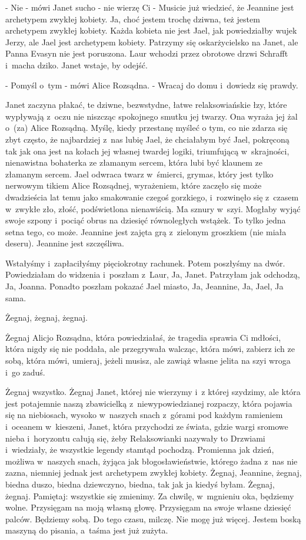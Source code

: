 \documentclass[oneside,polish,12pt,sfheadings]{mwbk}
\begin{document}
- Nie - mówi Janet sucho - nie wierzę Ci - Musicie już wiedzieć, że
Jeannine jest archetypem zwykłej kobiety. Ja, choć jestem trochę dziwna,
też jestem archetypem zwykłej kobiety. Każda kobieta nie jest Jael,
jak powiedziałby wujek Jerzy, ale Jael jest archetypem kobiety. Patrzymy
się oskarżycielsko na Janet, ale Panna Evasyn nie jest poruszona.
Laur wchodzi przez obrotowe drzwi Schrafft i~macha dziko. Janet wstaje,
by odejść.

- Pomyśl o~tym - mówi Alice Rozsądna. - Wracaj do domu i~dowiedz się
prawdy.

Janet zaczyna płakać, te dziwne, bezwstydne, łatwe relaksowiańskie
łzy, które wypływają z~oczu nie niszcząc spokojnego smutku jej twarzy.
Ona wyraża jej żal o~(za) Alice Rozsądną. Myślę, kiedy przestanę myśleć
o tym, co nie zdarza się zbyt często, że najbardziej z~nas lubię Jael,
że chciałabym być Jael, pokręconą tak jak ona jest na kołach jej własnej
twardej logiki, triumfującą w~skrajności, nienawistna bohaterka ze
złamanym sercem, która lubi być klaunem ze złamanym sercem. Jael odwraca
twarz w~śmierci, grymas, który jest tylko nerwowym tikiem Alice Rozsądnej,
wyrażeniem, które zaczęło się może dwadzieścia lat temu jako smakowanie
czegoś gorzkiego, i~rozwinęło się z~czasem w~zwykłe zło, złość, podświetlona
nienawiścią. Ma sznury w~szyi. Mogłaby wyjąć swoje szpony i~pociąć
obrus na dziesięć równoległych wstążek. To tylko jedna setna tego,
co może. Jeannine jest zajęta grą z~zielonym groszkiem (nie miała
deseru). Jeannine jest szczęśliwa.

Wstałyśmy i~zapłaciłyśmy pięciokrotny rachunek. Potem poszłyśmy na
dwór. Powiedziałam do widzenia i~poszłam z~Laur, Ja, Janet. Patrzyłam
jak odchodzą, Ja, Joanna. Ponadto poszłam pokazać Jael miasto, Ja,
Jeannine, Ja, Jael, Ja sama.

Żegnaj, żegnaj, żegnaj.

Żegnaj Alicjo Rozsądna, która powiedziałaś, że tragedia sprawia Ci
mdłości, która nigdy się nie poddała, ale przegrywała walcząc, która
mówi, zabierz ich ze sobą, która mówi, umieraj, jeżeli musisz, ale
zawiąż własne jelita na szyi wroga i~go zaduś.

Żegnaj wszystko. Żegnaj Janet, której nie wierzymy i~z której szydzimy,
ale która jest potajemnie naszą zbawicielką z~niewypowiedzianej rozpaczy,
która pojawia się na niebiosach, wysoko w~naszych snach z~górami pod
każdym ramieniem i~oceanem w~kieszeni, Janet, która przychodzi ze
świata, gdzie wargi sromowe nieba i~horyzontu całują się, żeby Relaksowianki
nazywały to Drzwiami i~wiedziały, że wszystkie legendy stamtąd pochodzą.
Promienna jak dzień, możliwa w~naszych snach, żyjąca jak błogosławieństwie,
którego żadna z~nas nie zazna, niemniej jednak jest archetypem zwykłej
kobiety. Żegnaj, Jeannine, żegnaj, biedna duszo, biedna dziewczyno,
biedna, tak jak ja kiedyś byłam. Żegnaj, żegnaj. Pamiętaj: wszystkie
się zmienimy. Za chwilę, w~mgnieniu oka, będziemy wolne. Przysięgam
na moją własną głowę. Przysięgam na swoje własne dziesięć palców. Będziemy
sobą. Do tego czasu, milczę. Nie mogę już więcej. Jestem boską maszyną
do pisania, a~taśma jest już zużyta.
\end{document}
